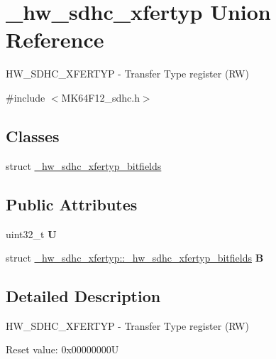 \hypertarget{union__hw__sdhc__xfertyp}{}\section{\+\_\+hw\+\_\+sdhc\+\_\+xfertyp Union Reference}
\label{union__hw__sdhc__xfertyp}


H\+W\+\_\+\+S\+D\+H\+C\+\_\+\+X\+F\+E\+R\+T\+YP -\/ Transfer Type register (RW)  




{\ttfamily \#include $<$M\+K64\+F12\+\_\+sdhc.\+h$>$}

\subsection*{Classes}
\begin{DoxyCompactItemize}
\item 
struct \hyperlink{struct__hw__sdhc__xfertyp_1_1__hw__sdhc__xfertyp__bitfields}{\+\_\+hw\+\_\+sdhc\+\_\+xfertyp\+\_\+bitfields}
\end{DoxyCompactItemize}
\subsection*{Public Attributes}
\begin{DoxyCompactItemize}
\item 
uint32\+\_\+t {\bfseries U}\hypertarget{union__hw__sdhc__xfertyp_ae6c1c9f52d31bff15f57cd28acacbfa5}{}\label{union__hw__sdhc__xfertyp_ae6c1c9f52d31bff15f57cd28acacbfa5}

\item 
struct \hyperlink{struct__hw__sdhc__xfertyp_1_1__hw__sdhc__xfertyp__bitfields}{\+\_\+hw\+\_\+sdhc\+\_\+xfertyp\+::\+\_\+hw\+\_\+sdhc\+\_\+xfertyp\+\_\+bitfields} {\bfseries B}\hypertarget{union__hw__sdhc__xfertyp_aab5dea3f6e50aa91d1240e17a0bdf64e}{}\label{union__hw__sdhc__xfertyp_aab5dea3f6e50aa91d1240e17a0bdf64e}

\end{DoxyCompactItemize}


\subsection{Detailed Description}
H\+W\+\_\+\+S\+D\+H\+C\+\_\+\+X\+F\+E\+R\+T\+YP -\/ Transfer Type register (RW) 

Reset value\+: 0x00000000U

